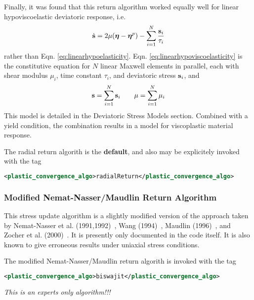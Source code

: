 Finally, it was found that this return algorithm worked equally well
for linear hypoviscoelastic deviatoric response, i.e.
  \begin{equation}\label{eq:linearhypoviscoelasticity}
    \dot{\mathbf{s}} = 2\mu(\boldsymbol{\eta} - \boldsymbol{\eta}^p) - \sum_{i=1}^N \frac{\mathbf{s}_i}{\tau_i}
  \end{equation}
rather than Eqn. \ref{eq:linearhypoelasticity}.
Eqn. \ref{eq:linearhypoviscoelasticity} is the constitutive equation
for $N$ linear Maxwell elements in parallel, each with shear modulus
$\mu_i$, time constant $\tau_i$, and deviatoric stress $\mathbf{s}_i$, and
  \begin{equation}
    \mathbf{s} = \sum_{i=1}^N \mathbf{s}_i \quad\quad \mu = \sum_{i=1}^N \mu_i
  \end{equation}
This model is detailed in the Deviatoric Stress Models section.
Combined with a yield condition, the combination results in a
model for viscoplastic material response.

The radial return algorith is the {\bf default}, and also may be
explicitely invoked with the tag
  \begin{lstlisting}[language=XML]
    <plastic_convergence_algo>radialReturn</plastic_convergence_algo>
  \end{lstlisting}

\subsubsection{Modified Nemat-Nasser/Maudlin Return Algorithm}

This stress update algorithm is a slightly modified version of the
approach taken by Nemat-Nasser et
al. (1991,1992)~\cite{Nemat1991,Nemat1992}, Wang (1994)~\cite{Wang1994},
Maudlin (1996)~\cite{Maudlin1996}, and Zocher et
al. (2000)~\cite{Zocher2000}.  It is presently only documented in the
code itself.  It is also known to give erroneous results under uniaxial
stress conditions.

The modified Nemat-Nasser/Maudlin return algorith is invoked with
the tag
  \begin{lstlisting}[language=XML]
    <plastic_convergence_algo>biswajit</plastic_convergence_algo>
  \end{lstlisting}
{\it This is an experts only algorithm!!!}

